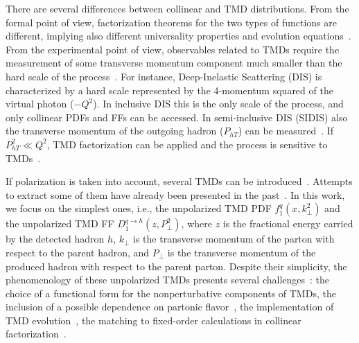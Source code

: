 \documentclass[aps,preprintnumbers,showpacs,nofootinbib,superscriptaddress,floatfix]{revtex4}
\newcommand{\T}{\perp}
\begin{document}
There are several differences between collinear and TMD distributions. From
the formal point of view, factorization theorems for the two types of
functions are different, implying also different universality
properties and evolution equations~\cite{Rogers:2015sqa}. From the
experimental point 
of view, observables related to TMDs require the measurement of some transverse
momentum component much smaller than the hard scale of the
process~\cite{Bacchetta:2016ccz,Radici:2016hbh}.  For
instance, Deep-Inelastic Scattering (DIS) is characterized by a hard scale represented by the
4-momentum squared of the virtual photon ($-Q^2$). In inclusive DIS this is
the only scale of the process, and only collinear PDFs
and FFs can be accessed. In semi-inclusive DIS (SIDIS) also the transverse momentum of the
outgoing  
hadron ($P_{hT}$) can be measured~\cite{Mulders:1995dh,Bacchetta:2006tn}. 
If $P_{hT}^2\ll Q^2$, TMD
factorization can be applied and the process is sensitive to
TMDs~\cite{Collins:2011zzd}. 


If polarization is taken into account, several TMDs can be
introduced~\cite{Mulders:1995dh,Boer:1997nt,%
Bacchetta:2000jk,%
Mulders:2000sh,%
Boer:2016xqr%
}. Attempts to extract some of them have already been presented in the past~\cite{Bacchetta:2011gx,Anselmino:2012aa,Echevarria:2014xaa,Anselmino:2016uie,%
Lu:2009ip,Barone:2015ksa,%
Lefky:2014eia,%
Anselmino:2013vqa,Kang:2015msa%
}.  In
this work, we focus on the simplest ones, i.e., the unpolarized TMD
PDF $f_1^q(x,k_{\T}^2)$ and the unpolarized TMD
FF $D_1^{q \to h}(z,P_{\perp}^2)$, where $z$ is
  the fractional energy carried by the detected hadron $h$, $k_{\T}$ is the
  transverse momentum of the parton with respect to the parent hadron, and
  $P_{\perp}$ is the transverse momentum of the produced hadron with
  respect to the parent parton. Despite their
  simplicity, the phenomenology of these unpolarized TMDs presents several
  challenges~\cite{Signori:2016lvd}: the choice of a functional form 
  for the nonperturbative components of TMDs, 
  the inclusion of a possible dependence on partonic
  flavor~\cite{Signori:2013mda}, the implementation of TMD
  evolution~\cite{Bacchetta:2015ora,Rogers:2015sqa}, the matching to
  fixed-order calculations in collinear
  factorization~\cite{Collins:2016hqq}. 
\end{document}
